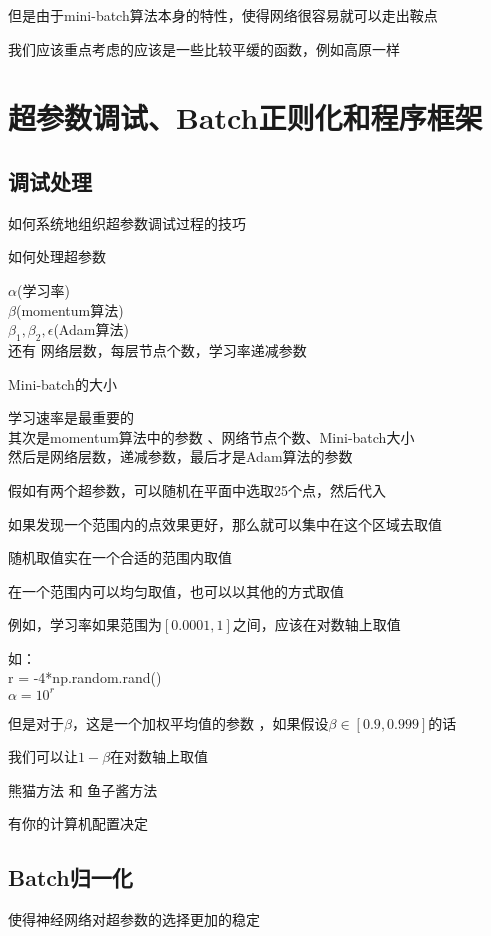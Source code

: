 \documentclass[UTF8]{ctexrep}
\begin{document}
但是由于mini-batch算法本身的特性，使得网络很容易就可以走出鞍点

我们应该重点考虑的应该是一些比较平缓的函数，例如高原一样

\chapter{超参数调试、Batch正则化和程序框架}

\section{调试处理}
如何系统地组织超参数调试过程的技巧

如何处理超参数

$\alpha$(学习率)\\$\beta$(momentum算法)\\
$\beta_1,\beta_2,\epsilon$(Adam算法)\\

还有 网络层数，每层节点个数，学习率递减参数

Mini-batch的大小

学习速率是最重要的\\其次是momentum算法中的参数
、网络节点个数、Mini-batch大小\\然后是网络层数，递减参数，最后才是Adam算法的参数

假如有两个超参数，可以随机在平面中选取25个点，然后代入

如果发现一个范围内的点效果更好，那么就可以集中在这个区域去取值

随机取值实在一个合适的范围内取值

在一个范围内可以均匀取值，也可以以其他的方式取值

例如，学习率如果范围为$[0.0001,1]$之间，应该在对数轴上取值

如： \\r = -4*np.random.rand()
\\$\alpha=10^r$

但是对于$\beta$，这是一个加权平均值的参数
，如果假设$\beta \in [0.9,0.999]$的话

我们可以让$1-\beta$在对数轴上取值

熊猫方法 和 鱼子酱方法

有你的计算机配置决定

\section{Batch归一化}

使得神经网络对超参数的选择更加的稳定
\end{document}
